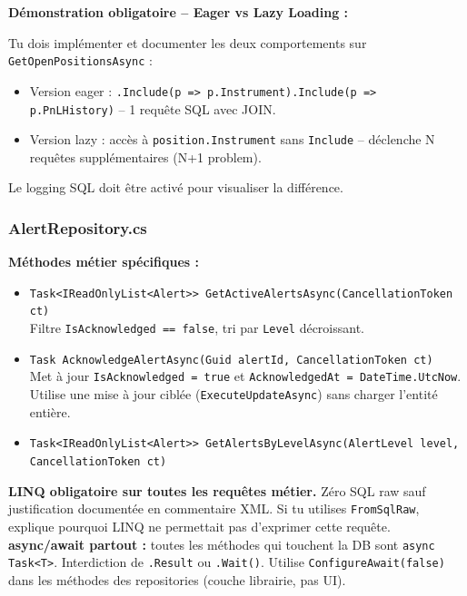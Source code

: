 \documentclass[a4paper,11pt]{article}
\newcommand{\cs}[1]{\texttt{\color{codeinline}#1}}
\begin{document}
\textbf{Démonstration obligatoire -- Eager vs Lazy Loading :}

Tu dois implémenter et documenter les deux comportements sur
\cs{GetOpenPositionsAsync} :
\begin{itemize}
  \item Version eager : \cs{.Include(p => p.Instrument).Include(p => p.PnLHistory)} --
        1 requête SQL avec JOIN.
  \item Version lazy : accès à \cs{position.Instrument} sans \cs{Include} --
        déclenche N requêtes supplémentaires (N+1 problem).
\end{itemize}
Le logging SQL doit être activé pour visualiser la différence.

\subsubsection{AlertRepository.cs}

\textbf{Méthodes métier spécifiques :}
\begin{itemize}
  \item \cs{Task<IReadOnlyList<Alert>> GetActiveAlertsAsync(CancellationToken ct)}\\
        Filtre \cs{IsAcknowledged == false}, tri par \cs{Level} décroissant.
  \item \cs{Task AcknowledgeAlertAsync(Guid alertId, CancellationToken ct)}\\
        Met à jour \cs{IsAcknowledged = true} et \cs{AcknowledgedAt = DateTime.UtcNow}.
        Utilise une mise à jour ciblée (\cs{ExecuteUpdateAsync}) sans charger
        l'entité entière.
  \item \cs{Task<IReadOnlyList<Alert>> GetAlertsByLevelAsync(AlertLevel level, CancellationToken ct)}
\end{itemize}

\begin{tcolorbox}[constraint]
\textbf{LINQ obligatoire sur toutes les requêtes métier.} Zéro SQL raw sauf
justification documentée en commentaire XML. Si tu utilises \cs{FromSqlRaw},
explique pourquoi LINQ ne permettait pas d'exprimer cette requête. \\[4pt]
\textbf{async/await partout :} toutes les méthodes qui touchent la DB sont
\cs{async Task<T>}. Interdiction de \cs{.Result} ou \cs{.Wait()}. Utilise
\cs{ConfigureAwait(false)} dans les méthodes des repositories (couche librairie,
pas UI).
\end{tcolorbox}

\end{document}
